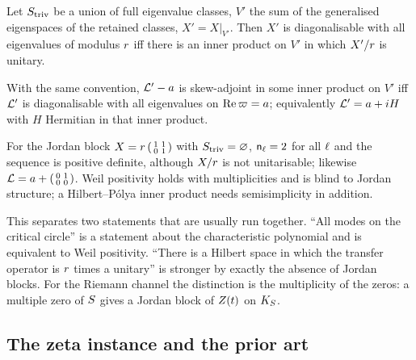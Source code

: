 \begin{proposition}
\label{prop:hp-inner-product-discrete}
Let $S_{\mathrm{triv}}$ be a union of full eigenvalue classes, $V'$ the sum of the generalised
eigenspaces of the retained classes, $X' = X|_{V'}$. Then $X'$ is diagonalisable with all
eigenvalues of modulus $r$ iff there is an inner product on $V'$ in which $X'/r$
is unitary.
\end{proposition}

\begin{proposition}
\label{prop:hp-inner-product-continuous}
With the same convention, $\mathcal L'-a$ is skew-adjoint in some inner product on $V'$ iff
$\mathcal L'$ is diagonalisable with all eigenvalues on $\operatorname{Re}\varpi = a$; equivalently $\mathcal L'
= a+iH$ with $H$ Hermitian in that inner product.
\end{proposition}

\begin{proposition}
\label{prop:weil-blind-jordan}
For the Jordan block $X = r\left(\begin{smallmatrix}1&1\\0&1\end{smallmatrix}\right)$
with $S_{\mathrm{triv}} = \varnothing$, $\mathsf n_{\ell} = 2$ for all $\ell$ and the sequence is positive
definite, although $X/r$ is not unitarisable; likewise $\mathcal L = a+
\left(\begin{smallmatrix}0&1\\0&0\end{smallmatrix}\right)$. Weil positivity holds with
multiplicities and is blind to Jordan structure; a Hilbert--P\'olya inner product needs
semisimplicity in addition.
\end{proposition}

This separates two statements that are usually run together. ``All modes on the critical
circle'' is a statement about the characteristic polynomial and is equivalent to Weil
positivity. ``There is a Hilbert space in which the transfer operator is $r$ times a
unitary'' is stronger by exactly the absence of Jordan blocks. For the Riemann channel the
distinction is the multiplicity of the zeros: a multiple zero of $S$ gives a Jordan
block of $Z(t)$ on $K_S$.

\subsection{The zeta instance and the prior art}

